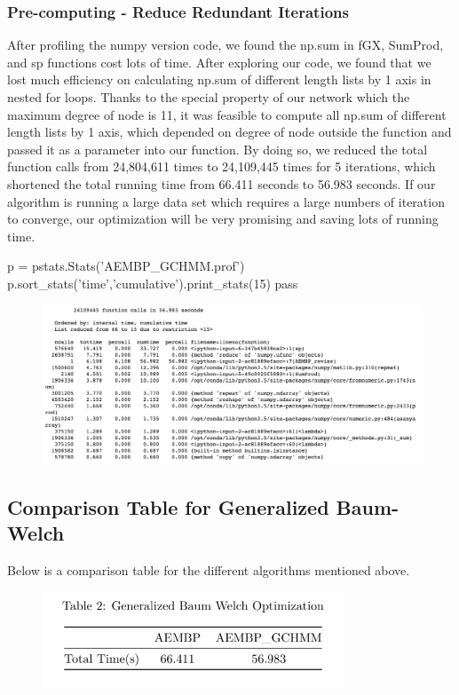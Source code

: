 \documentclass{article} %
\begin{document}
\subsubsection{Pre-computing - Reduce Redundant Iterations}
After profiling the numpy version code, we found the np.sum in fGX, SumProd, and sp functions cost lots of time. After exploring our code, we found that we lost much efficiency on calculating np.sum of different length lists by 1 axis in nested for loops. Thanks to the special property of our network which the maximum degree of node is 11, it was feasible to compute all np.sum of different length lists by 1 axis, which depended on degree of node outside the function and passed it as a parameter into our function. By doing so, we reduced the total function calls from 24,804,611 times to 24,109,445 times for 5 iterations, which shortened the total running time from 66.411 seconds to 56.983 seconds. If our algorithm is running a large data set which requires a large numbers of iteration to converge, our optimization will be very promising and saving lots of running time.

\begin{python}
p = pstats.Stats('AEMBP_GCHMM.prof')
p.sort_stats('time','cumulative').print_stats(15)
pass
\end{python}
\begin{figure}[htpb]
\centering
\includegraphics[width=160mm]{AEMBP_revise_profile.png}
\end{figure}

\subsection{Comparison Table for Generalized Baum-Welch}
Below is a comparison table for the different algorithms mentioned above.
\begin{figure}[htpb]
\centering
\includegraphics[width=90mm]{AEMBP.png}
\end{figure}
\end{document}
